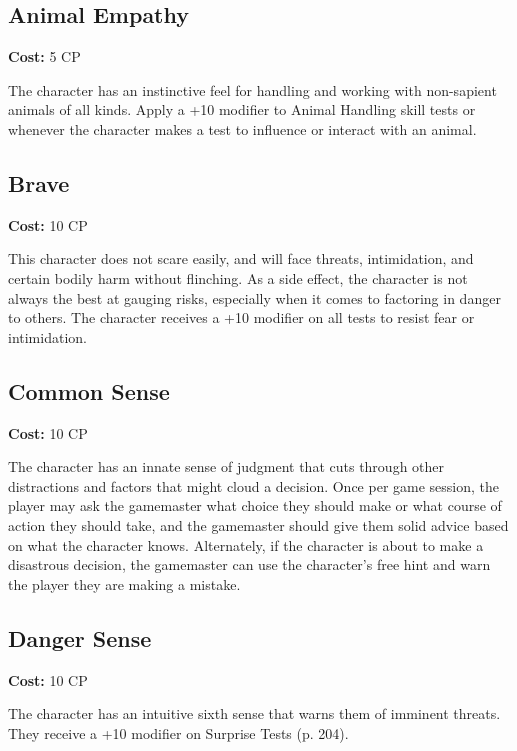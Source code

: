 \subsection{Animal Empathy} \label{sec:traits-animal-empathy} 

\textbf{Cost:} 5 CP 

The character has an instinctive feel for handling and working with non-sapient animals of all kinds. Apply a +10 modifier to Animal Handling skill tests or whenever the character makes a test to influence or interact with an animal. 

\subsection{Brave} \label{sec:traits-brave} 

\textbf{Cost:} 10 CP 

This character does not scare easily, and will face threats, intimidation, and certain bodily harm without flinching. As a side effect, the character is not always the best at gauging risks, especially when it comes to factoring in danger to others. The character receives a +10 modifier on all tests to resist fear or intimidation. 

\subsection{Common Sense} \label{sec:traits-common-sense} 

\textbf{Cost:} 10 CP 

The character has an innate sense of judgment that cuts through other distractions and factors that might cloud a decision. Once per game session, the player may ask the gamemaster what choice they should make or what course of action they should take, and the gamemaster should give them solid advice based on what the character knows. Alternately, if the character is about to make a disastrous decision, the gamemaster can use the character’s free hint and warn the player they are making a mistake. 

\subsection{Danger Sense} \label{sec:traits-danger-sense} 

\textbf{Cost:} 10 CP 

The character has an intuitive sixth sense that warns them of imminent threats. They receive a +10 modifier on Surprise Tests (p. 204). 

